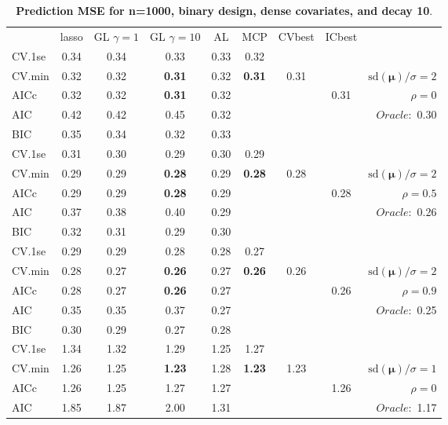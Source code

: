 \clearpage
\begin{table}\vspace{-.5cm}
\caption[l]{ { \bf Prediction MSE for n=1000, binary design, 
dense covariates, and  decay  10}.}
\vspace{-.5cm}
\footnotesize{}
\begin{center}
\begin{tabular}{l*{7}{c}|r}
 & lasso & GL $\gamma=1$ & GL $\gamma=10$ & AL & MCP  & CVbest & ICbest  \\
\cline{1-9}
CV.1se & 0.34 & 0.34 & 0.33 & 0.33 & 0.32 & & & \\
CV.min & 0.32 & 0.32 & {\bf 0.31} & 0.32 & {\bf 0.31} & 0.31 & & $\mathrm{sd}(\mathbf{\mu})/\sigma=2$ \\
AICc & 0.32 & 0.32 & {\bf 0.31} & 0.32 & & & 0.31 &  $\rho=0$ \\
AIC & 0.42 & 0.42 & 0.45 & 0.32 & & & &  \multirow{2}{*}{$Oracle: $ 0.30} \\
BIC & 0.35 & 0.34 & 0.32 & 0.33 & & & &  \\
 \hline 
CV.1se & 0.31 & 0.30 & 0.29 & 0.30 & 0.29 & & & \\
CV.min & 0.29 & 0.29 & {\bf 0.28} & 0.29 & {\bf 0.28} & 0.28 & & $\mathrm{sd}(\mathbf{\mu})/\sigma=2$ \\
AICc & 0.29 & 0.29 & {\bf 0.28} & 0.29 & & & 0.28 &  $\rho=0.5$ \\
AIC & 0.37 & 0.38 & 0.40 & 0.29 & & & &  \multirow{2}{*}{$Oracle: $ 0.26} \\
BIC & 0.32 & 0.31 & 0.29 & 0.30 & & & &  \\
 \hline 
CV.1se & 0.29 & 0.29 & 0.28 & 0.28 & 0.27 & & & \\
CV.min & 0.28 & 0.27 & {\bf 0.26} & 0.27 & {\bf 0.26} & 0.26 & & $\mathrm{sd}(\mathbf{\mu})/\sigma=2$ \\
AICc & 0.28 & 0.27 & {\bf 0.26} & 0.27 & & & 0.26 &  $\rho=0.9$ \\
AIC & 0.35 & 0.35 & 0.37 & 0.27 & & & &  \multirow{2}{*}{$Oracle: $ 0.25} \\
BIC & 0.30 & 0.29 & 0.27 & 0.28 & & & &  \\
 \hline 
CV.1se & 1.34 & 1.32 & 1.29 & 1.25 & 1.27 & & & \\
CV.min & 1.26 & 1.25 & {\bf 1.23} & 1.28 & {\bf 1.23} & 1.23 & & $\mathrm{sd}(\mathbf{\mu})/\sigma=1$ \\
AICc & 1.26 & 1.25 & 1.27 & 1.27 & & & 1.26 &  $\rho=0$ \\
AIC & 1.85 & 1.87 & 2.00 & 1.31 & & & &  \multirow{2}{*}{$Oracle: $ 1.17} \\

\end{tabular}
\end{center}
\end{table}

